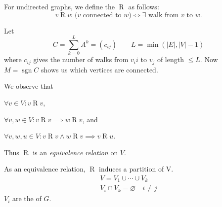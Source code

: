 \begin{definition}
For undirected graphs, we define the  $\operatorname{R}$ as follows:
\[ v \operatorname{R} w \text{ ($v$ connected to $w$)} \iff \exists\text{ walk from $v$ to $w$}. \]
\end{definition}

Let
\[ C = \sum_{k=0}^L A^k = (c_{ij})\qquad L = \min(|E|, |V|-1) \]
where $c_{ij}$ gives the number of walks from $v_ii$ to $v_j$ of length $\leq
L$. Now $M = \operatorname{sgn} C$ shows us which vertices are connected.

We observe that
\begin{compactitem}
\item $\forall v\in V: v \operatorname{R} v$,
\item $\forall v,w\in V: v \operatorname{R} v \implies w \operatorname{R} v$, and
\item $\forall v,w,u\in V: v \operatorname{R} v \wedge w \operatorname{R} v \implies v \operatorname{R} u$.
\end{compactitem}
Thus $\operatorname{R}$ is an \emph{equivalence relation} on $V$.

As an equivalence relation, $\operatorname{R}$ induces a partition of V.
\begin{gather*}
V = V_1 \cup\cdots\cup V_k \\
V_i \cap V_k = \varnothing\quad i\neq j
\end{gather*}
%
$V_i$ are the  of $G$.

